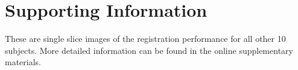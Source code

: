 \section{Supporting Information}
\label{SI}
These are single slice images of the registration performance for all other 10 subjects. More detailed information can be found in the online supplementary materials.

